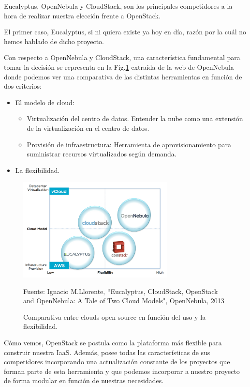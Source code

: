 Eucalyptus, OpenNebula y CloudStack, son los principales competidores a la hora de realizar nuestra elección frente a OpenStack. 

El primer caso, Eucalyptus, si ni quiera existe ya hoy en día, razón por la cuál no hemos hablado de dicho proyecto.

Con respecto a OpenNebula y CloudStack, una característica fundamental para tomar la decisión se representa en la Fig.\ref{comparativa cloud open source} extraída de la web de OpenNebula \cite{noauthor_eucalyptus_nodate} donde podemos ver una comparativa de las distintas herramientas en función de dos criterios:

\begin{itemize}
\item El modelo de cloud:
\begin{itemize}
\item Virtualización del centro de datos. Entender la nube como una extensión de la virtualización en el centro de datos.
\item Provisión de infraestructura: Herramienta de aprovisionamiento para suministrar recursos virtualizados según demanda.
\end{itemize}
\item La flexibilidad.
\end{itemize}

\begin{figure}
    \centering
    \includegraphics[width=0.7\textwidth]{imagenes/capitulo2/comparativaCloudPublica.png}
    \caption{Comparativa entre clouds open source en función del uso y la flexibilidad.}
	\vspace{0.3cm}
    \footnotesize{Fuente: Ignacio M.Llorente, “Eucalyptus, CloudStack, OpenStack and OpenNebula: A Tale of Two Cloud Models", OpenNebula, 2013}
    \label{comparativa cloud open source}
\end{figure}

Cómo vemos, OpenStack se postula como la plataforma más flexible para construir nuestra IaaS. Además, posee todas las características de sus competidores incorporando una actualización constante de los proyectos que forman parte de esta herramienta y que podemos incorporar a nuestro proyecto de forma modular en función de nuestras necesidades.

